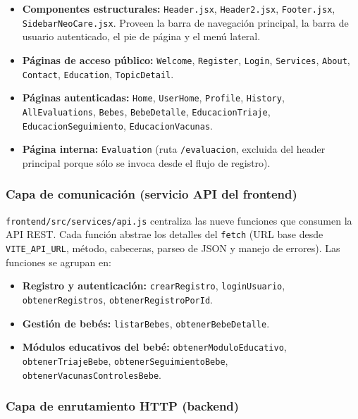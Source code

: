 \documentclass[12pt,letterpaper]{article}
\begin{document}
\begin{itemize}
    \item \textbf{Componentes estructurales:} \texttt{Header.jsx}, \texttt{Header2.jsx}, \texttt{Footer.jsx}, \texttt{SidebarNeoCare.jsx}. Proveen la barra de navegación principal, la barra de usuario autenticado, el pie de página y el menú lateral.
    \item \textbf{Páginas de acceso público:} \texttt{Welcome}, \texttt{Register}, \texttt{Login}, \texttt{Services}, \texttt{About}, \texttt{Contact}, \texttt{Education}, \texttt{TopicDetail}.
    \item \textbf{Páginas autenticadas:} \texttt{Home}, \texttt{UserHome}, \texttt{Profile}, \texttt{History}, \texttt{AllEvaluations}, \texttt{Bebes}, \texttt{BebeDetalle}, \texttt{EducacionTriaje}, \texttt{EducacionSeguimiento}, \texttt{EducacionVacunas}.
    \item \textbf{Página interna:} \texttt{Evaluation} (ruta \texttt{/evaluacion}, excluida del header principal porque sólo se invoca desde el flujo de registro).
\end{itemize}

\subsubsection{Capa de comunicación (servicio API del frontend)}

\texttt{frontend/src/services/api.js} centraliza las nueve funciones que consumen la API REST. Cada función abstrae los detalles del \texttt{fetch} (URL base desde \texttt{VITE\_API\_URL}, método, cabeceras, parseo de JSON y manejo de errores). Las funciones se agrupan en:

\begin{itemize}
    \item \textbf{Registro y autenticación:} \texttt{crearRegistro}, \texttt{loginUsuario}, \texttt{obtenerRegistros}, \texttt{obtenerRegistroPorId}.
    \item \textbf{Gestión de bebés:} \texttt{listarBebes}, \texttt{obtenerBebeDetalle}.
    \item \textbf{Módulos educativos del bebé:} \texttt{obtenerModuloEducativo}, \texttt{obtenerTriajeBebe}, \texttt{obtenerSeguimientoBebe}, \texttt{obtenerVacunasControlesBebe}.
\end{itemize}

\subsubsection{Capa de enrutamiento HTTP (backend)}
\end{document}
